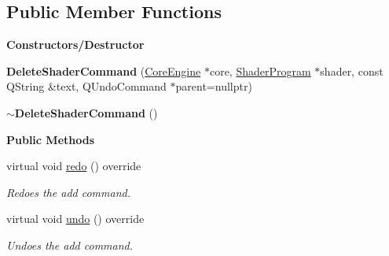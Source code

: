 \subsection*{Public Member Functions}
\begin{Indent}\textbf{ Constructors/\+Destructor}\par
\begin{DoxyCompactItemize}
\item 
\mbox{\label{classrev_1_1_delete_shader_command_a6f2fd9c058b06f15d2e57dcc155df565}} 
{\bfseries Delete\+Shader\+Command} (\mbox{\hyperlink{classrev_1_1_core_engine}{Core\+Engine}} $\ast$core, \mbox{\hyperlink{classrev_1_1_shader_program}{Shader\+Program}} $\ast$shader, const Q\+String \&text, Q\+Undo\+Command $\ast$parent=nullptr)
\item 
\mbox{\label{classrev_1_1_delete_shader_command_a794a04b2a2530d42a5a97fe3de7584a6}} 
{\bfseries $\sim$\+Delete\+Shader\+Command} ()
\end{DoxyCompactItemize}
\end{Indent}
\begin{Indent}\textbf{ Public Methods}\par
\begin{DoxyCompactItemize}
\item 
\mbox{\label{classrev_1_1_delete_shader_command_abb0d9c9b745bb02af8b833500b5a90a7}} 
virtual void \mbox{\hyperlink{classrev_1_1_delete_shader_command_abb0d9c9b745bb02af8b833500b5a90a7}{redo}} () override
\begin{DoxyCompactList}\small\item\em Redoes the add command. \end{DoxyCompactList}\item 
\mbox{\label{classrev_1_1_delete_shader_command_a719c2e6f2b29329bb880a12cd504a116}} 
virtual void \mbox{\hyperlink{classrev_1_1_delete_shader_command_a719c2e6f2b29329bb880a12cd504a116}{undo}} () override
\begin{DoxyCompactList}\small\item\em Undoes the add command. \end{DoxyCompactList}\end{DoxyCompactItemize}
\end{Indent}
